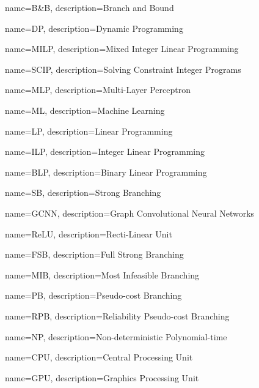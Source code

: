 

\makeglossaries %


{
        name=B\&B,
        description={Branch and Bound}
}

{
        name=DP,
        description={Dynamic Programming}
}

{
        name=MILP,
        description={Mixed Integer Linear Programming}
}

{
        name=SCIP,
        description={Solving Constraint Integer Programs}
}

{
        name=MLP,
        description={Multi-Layer Perceptron}
}

{
        name=ML,
        description={Machine Learning}
}

{
        name=LP,
        description={Linear Programming}
}

{
        name=ILP,
        description={Integer Linear Programming}
}

{
        name=BLP,
        description={Binary Linear Programming}
}

{
        name=SB,
        description={Strong Branching}
}

{
        name=GCNN,
        description={Graph Convolutional Neural Networks}
}

{
        name=ReLU,
        description={Recti-Linear Unit}
}

{
        name=FSB,
        description={Full Strong Branching}
}

{
        name=MIB,
        description={Most Infeasible Branching}
}

{
        name=PB,
        description={Pseudo-cost Branching}
}

{
        name=RPB,
        description={Reliability Pseudo-cost Branching}
}

{
        name=NP,
        description={Non-deterministic Polynomial-time}
}

{
        name=CPU,
        description={Central Processing Unit}
}

{
        name=GPU,
        description={Graphics Processing Unit}
}

